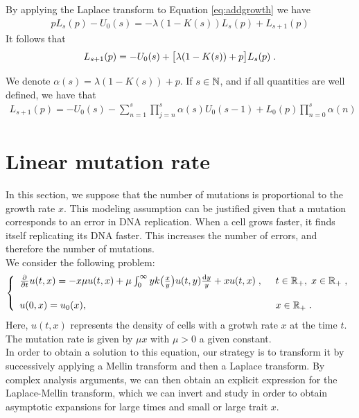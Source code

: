 \documentclass[11pt]{amsart}
\begin{document}
By applying the Laplace transform to Equation \eqref{eq:addgrowth} we have 
\begin{align*}
    pL_s(p) - U_0(s) = -  \lambda (1-K(s)) L_s(p) + L_{s+1}(p)
\end{align*}
It follows that 
\begin{align*}
    L_{s+1}(p) = - U_0(s) + \big[\lambda (1-K(s)) + p \big]L_s(p)
    \; .
\end{align*}

\begin{remark}
We denote $\alpha(s) = \lambda (1-K(s)) + p$. If $s \in \mathbb{N}$, and if all quantities are well defined, we have that
\begin{align*}
    L_{s+1}(p) = -U_0(s) -\sum_{n = 1}^{s} \prod_{j = n}^s \alpha(s)U_0(s-1) + L_0(p) \prod_{n = 0}^{s}\alpha(n)
\end{align*}
\end{remark}



\section{Linear mutation rate}

In this section, we suppose that the number of mutations is proportional to the growth rate $x$. This modeling assumption can be justified given that a mutation corresponds to an error in DNA replication. When a cell grows faster, it finds itself replicating its DNA faster. This increases the number of errors, and therefore the number of mutations.\\

We consider the following problem:
\begin{equation}\left\{
    \begin{array}{ll}
	\frac{\partial}{\partial t}u(t,x) = - x\mu u(t,x) + \mu \int_{0}^{\infty} y k\big( \frac{x}{y}\big) u(t,y) \frac{\mathrm dy}{y} + xu(t,x)
	\; , \enspace
	& t \in \mathbb{R}_+, \; x \in \mathbb{R}_+ \; ,
	\\ \\
	u(0, x) = u_0(x),
	& x \in \mathbb{R}_+
	\; .
    \end{array}
	\right.
    \label{eq:linearmutrate}
\end{equation}
Here, $u(t,x)$ represents the density of cells with a grotwh rate $x$ at the time $t$. The mutation rate is given by $\mu x$ with $\mu>0$ a given constant. \\

In order to obtain a solution to this equation, our strategy is to transform it by successively applying a Mellin transform and then a Laplace transform. By complex analysis arguments, we can then obtain an explicit expression for the Laplace-Mellin transform, which we can invert and study in order to obtain asymptotic expansions for large times and small or large trait $x$. \\
\end{document}
